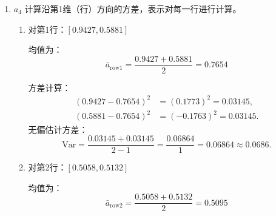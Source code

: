 \begin{example}
\begin{enumerate}[label=\arabic*)]
\begin{enumerate}[itemindent=1em,label=\arabic*)]
                        无偏估计方差：
                        $$\mathrm{Var}=\frac{0.0477+0.0477}{2-1}=\frac{0.0954}1=0.0954\approx0.0955.$$

                        \item 对第2列：$[0.5881,0.5132]$

                        均值为：
                        $$\bar{a}_{{\mathrm{col}2}}=\frac{0.5881+0.5132}{2}=0.55065.$$
        
                        方差计算：
                        $$\begin{aligned}
                                (0.5881-0.55065)^{2}&=(0.03745)^{2}=0.0014,\\
                                (0.5132-0.55065)^{2}&=(-0.03745)^{2}=0.0014.  
                        \end{aligned}$$  
                        无偏估计方差：
                        $$\mathrm{Var}=\frac{0.0014+0.0014}{2-1}=\frac{0.0028}1=0.0028$$
                \end{enumerate}
                因此 $a_3=[0.0955,0.0028]$。

                \item $a_4$
                计算沿第1维（行）方向的方差，表示对每一行进行计算。

                \begin{enumerate}[itemindent=1em,label=\arabic*)]
                        \item 对第1行：$[0.9427,0.5881]$

                        均值为：
                        $$\bar{a}_{{\mathrm{row}1}}=\frac{0.9427+0.5881}{2}=0.7654$$

                        方差计算：
                        $$\begin{aligned}
                                (0.9427-0.7654)^{2}&=(0.1773)^{2}=0.03145,\\
                                (0.5881-0.7654)^{2}&=(-0.1763)^{2}=0.03145.  
                        \end{aligned}$$  
                        无偏估计方差：
                        $$\mathrm{Var}=\frac{0.03145+0.03145}{2-1}=\frac{0.06864}1=0.06864\approx0.0686.$$

                        \item 对第2行：$[0.5058,0.5132]$

                        均值为：
                        $$\bar{a}_{{\mathrm{row}2}}=\frac{0.5058+0.5132}{2}=0.5095$$


\end{enumerate}
\end{enumerate}
\end{example}
